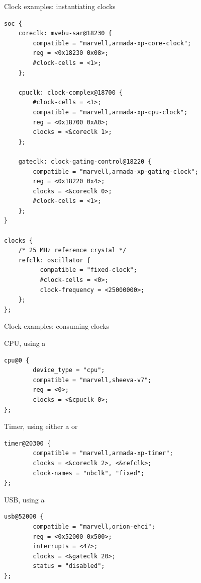 \documentclass[obeyspaces,spaces,hyphens]{beamer}
\begin{document}
\begin{frame}[fragile]{Clock examples: instantiating clocks}
  \begin{block}{}
    \begin{verbatim}
soc {
    coreclk: mvebu-sar@18230 {
        compatible = "marvell,armada-xp-core-clock";
        reg = <0x18230 0x08>;
        #clock-cells = <1>;
    };

    cpuclk: clock-complex@18700 {
        #clock-cells = <1>;
        compatible = "marvell,armada-xp-cpu-clock";
        reg = <0x18700 0xA0>;
        clocks = <&coreclk 1>;
    };

    gateclk: clock-gating-control@18220 {
        compatible = "marvell,armada-xp-gating-clock";
        reg = <0x18220 0x4>;
        clocks = <&coreclk 0>;
        #clock-cells = <1>;
    };
}

clocks {
    /* 25 MHz reference crystal */
    refclk: oscillator {
          compatible = "fixed-clock";
          #clock-cells = <0>;
          clock-frequency = <25000000>;
    };
};
  \end{verbatim}
\end{block}
\end{frame}

\begin{frame}[fragile]{Clock examples: consuming clocks}
  \begin{block}{CPU, using a }
    \begin{verbatim}
cpu@0 {
        device_type = "cpu";
        compatible = "marvell,sheeva-v7";
        reg = <0>;
        clocks = <&cpuclk 0>;
};
\end{verbatim}
  \end{block}

  \begin{block}{Timer, using either a  or }
    \begin{verbatim}
timer@20300 {
        compatible = "marvell,armada-xp-timer";
        clocks = <&coreclk 2>, <&refclk>;
        clock-names = "nbclk", "fixed";
};
\end{verbatim}
  \end{block}

  \begin{block}{USB, using a }
    \begin{verbatim}
usb@52000 {
        compatible = "marvell,orion-ehci";
        reg = <0x52000 0x500>;
        interrupts = <47>;
        clocks = <&gateclk 20>;
        status = "disabled";
};
\end{verbatim}
  \end{block}

\end{frame}
\end{document}
